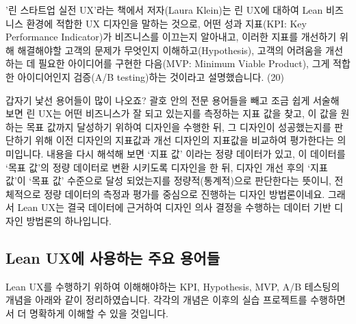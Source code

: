 \documentclass[
  letterpaper,
]{book}
\begin{document}
'린 스타트업 실전 UX'라는 책에서 저자(Laura Klein)는 린 UX에 대하여 Lean
비즈니스 환경에 적합한 UX 디자인을 말하는 것으로, 어떤 성과 지표(KPI:
Key Performance Indicator)가 비즈니스를 이끄는지 알아내고, 이러한 지표를
개선하기 위해 해결해야할 고객의 문제가 무엇인지 이해하고(Hypothesis),
고객의 어려움을 개선하는 데 필요한 아이디어를 구현한 다음(MVP: Minimum
Viable Product), 그게 적합한 아이디어인지 검증(A/B testing)하는 것이라고
설명했습니다. (20)

갑자기 낯선 용어들이 많이 나오죠? 괄호 안의 전문 용어들을 빼고 조금 쉽게
서술해 보면 린 UX는 어떤 비즈니스가 잘 되고 있는지를 측정하는 지표 값을
찾고, 이 값을 원하는 목표 값까지 달성하기 위하여 디자인을 수행한 뒤, 그
디자인이 성공했는지를 판단하기 위해 이전 디자인의 지표값과 개선 디자인의
지표값을 비교하여 평가한다는 의미입니다. 내용을 다시 해석해 보면 `지표
값' 이라는 정량 데이터가 있고, 이 데이터를 `목표 값'의 정량 데이터로
변환 시키도록 디자인을 한 뒤, 디자인 개선 후의 `지표 값'이 `목표 값'
수준으로 달성 되었는지를 정량적(통계적)으로 판단한다는 뜻이니,
전체적으로 정량 데이터의 측정과 평가를 중심으로 진행하는 디자인
방법론이네요. 그래서 Lean UX는 결국 데이터에 근거하여 디자인 의사 결정을
수행하는 데이터 기반 디자인 방법론의 하나입니다.

\subsection{Lean UX에 사용하는 주요
용어들}\label{lean-uxuxc5d0-uxc0acuxc6a9uxd558uxb294-uxc8fcuxc694-uxc6a9uxc5b4uxb4e4}

Lean UX를 수행하기 위하여 이해해야하는 KPI, Hypothesis, MVP, A/B
테스팅의 개념을 아래와 같이 정리하였습니다. 각각의 개념은 이후의 실습
프로젝트를 수행하면서 더 명확하게 이해할 수 있을 것입니다.
\end{document}
